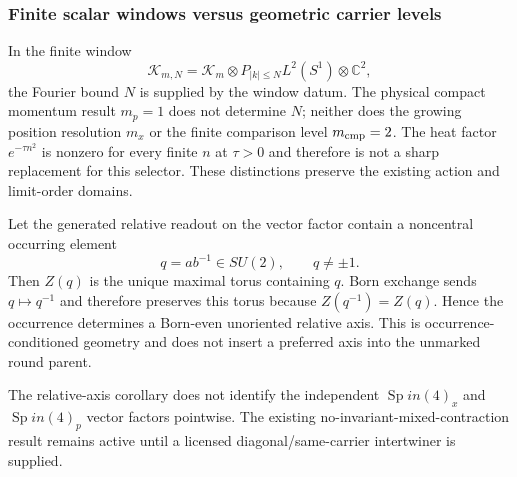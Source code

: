 \documentclass[12pt,a4paper]{article}
\begin{document}
\subsubsection{Finite scalar windows versus geometric carrier levels}
\label{p3b:sec:v180-independent-scalar-window}

\begin{remark}
\label{p3b:rem:independent-scalar-window-scope}
In the finite window
\[
 \mathcal K_{m,N}=\mathcal K_m\otimes
 P_{|k|\le N}L^2(S^1)\otimes\mathbb C^2,
\]
the Fourier bound $N$ is supplied by the window datum.  The physical compact
momentum result $m_p=1$ does not determine $N$; neither does the growing
position resolution $m_x$ or the finite comparison level
$m_{\rm cmp}=2$.  The heat factor $e^{-\tau n^2}$ is nonzero for every
finite $n$ at $\tau>0$ and therefore is not a sharp replacement for this
selector.  These distinctions preserve the existing action and limit-order
domains.
\end{remark}

\begin{corollary}
\label{p3b:cor:v191-relative-occurrence-axis}
Let the generated relative readout on the vector factor contain a noncentral
occurring element
\[
 q=ab^{-1}\in SU(2),\qquad q\neq\pm1.
\]
Then $Z(q)$ is the unique maximal torus containing $q$.  Born exchange sends
$q\mapsto q^{-1}$ and therefore preserves this torus because
$Z(q^{-1})=Z(q)$.  Hence the occurrence determines a Born-even unoriented
relative axis.  This is occurrence-conditioned geometry and does not insert a
preferred axis into the unmarked round parent.
\end{corollary}

\begin{remark}
The relative-axis corollary does not identify the independent
$\operatorname{Sp}in(4)_x$ and $\operatorname{Sp}in(4)_p$ vector factors pointwise.  The existing
no-invariant-mixed-contraction result remains active until a licensed
diagonal/same-carrier intertwiner is supplied.
\end{remark}
\end{document}
